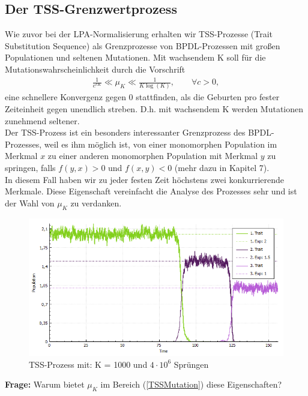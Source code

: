 \documentclass[11pt, a4paper, german]{article}
\theoremstyle{plain}
\begin{document}
	\subsection{Der TSS-Grenzwertprozess}
	Wie zuvor bei der LPA-Normalisierung erhalten wir TSS-Prozesse (Trait Substitution Sequence) als Grenzprozesse von BPDL-Prozessen mit großen Populationen und seltenen Mutationen. Mit wachsendem K  soll für die Mutationswahrscheinlichkeit durch die Vorschrift
	\begin{align}
		\frac{1}{e^{cK}} \ll \mu_K \ll \frac{1}{K \log(K)}, \qquad \forall c > 0, \label{TSSMutation}
	\end{align}
	eine schnellere Konvergenz gegen 0 stattfinden, als die Geburten pro fester Zeiteinheit gegen unendlich streben. D.h. mit wachsendem K werden Mutationen zunehmend seltener.\\ 
	Der TSS-Prozess ist ein besonders interessanter Grenzprozess des BPDL-Prozesses, weil es ihm möglich ist, von einer monomorphen Population im Merkmal $ x $ zu einer anderen monomorphen Population mit Merkmal $ y $ zu springen, falls $ f(y,x) > 0 $ und $ f(x,y) < 0 $ (mehr dazu in Kapitel 7).\\
	In diesem Fall haben wir zu jeder festen Zeit höchstens zwei konkurrierende Merkmale. Diese Eigenschaft vereinfacht die Analyse des Prozesses sehr und ist der Wahl von $ \mu_K $ zu verdanken.\\
	\begin{figure}[H]
		\centering
		\includegraphics[width=0.8\linewidth]{../BachelorArbeit/Pictures/TSS2_pure_small}
		\caption[TSS-Prozess wechselnder Dominanz]{TSS-Prozess mit: K = 1000 und $ 4 \cdot 10^6 $ Sprüngen}
		\label{TSS_mitBPDLSimulator}
	\end{figure}
	\textbf{Frage:} Warum bietet $ \mu_K $ im Bereich (\ref{TSSMutation}) diese Eigenschaften?\\
	
\end{document}
